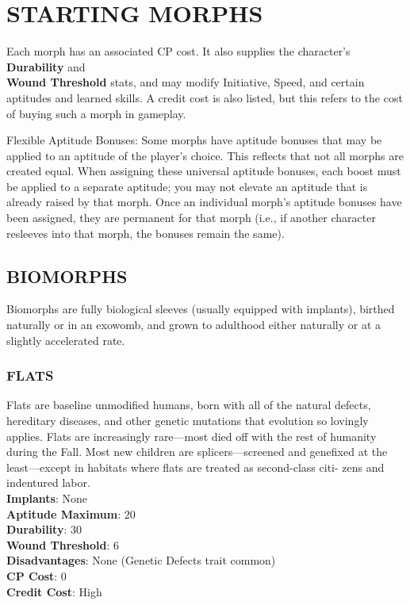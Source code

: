 \section{STARTING MORPHS}
Each morph has an associated CP cost. It also supplies the character’s \\ \textbf{Durability} and \\ \textbf{Wound Threshold}
stats, and may modify Initiative, Speed, and certain
aptitudes and learned skills. A credit cost is also listed,
but this refers to the cost of buying such a morph in
gameplay.

Flexible Aptitude Bonuses: Some morphs have aptitude bonuses that may be applied to an aptitude of
the player’s choice. This reflects that not all morphs
are created equal. When assigning these universal aptitude bonuses, each boost must be applied to a separate aptitude; you may not elevate an aptitude that
is already raised by that morph. Once an individual
morph’s aptitude bonuses have been assigned, they
are permanent for that morph (i.e., if another character resleeves into that morph, the bonuses remain
the same).

\subsection{BIOMORPHS}
Biomorphs are fully biological sleeves (usually
equipped with implants), birthed naturally or in an
exowomb, and grown to adulthood either naturally
or at a slightly accelerated rate.

\subsubsection{FLATS}
Flats are baseline unmodified humans, born with all
of the natural defects, hereditary diseases, and other
genetic mutations that evolution so lovingly applies.
Flats are increasingly rare—most died off with the rest
of humanity during the Fall. Most new children are
splicers—screened and genefixed at the least—except
in habitats where flats are treated as second-class citi-
zens and indentured labor.
\\ \textbf{Implants}: None
\\ \textbf{Aptitude Maximum}: 20
\\ \textbf{Durability}: 30
\\ \textbf{Wound Threshold}: 6
\\ \textbf{Disadvantages}: None (Genetic Defects trait common)
\\ \textbf{CP Cost}: 0
\\ \textbf{Credit Cost}: High

